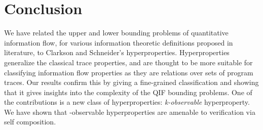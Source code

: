 \documentclass[]{eptcs}
\begin{document}
\section{Conclusion}

We have related the upper and lower bounding problems of quantitative
information flow, for various information theoretic definitions
proposed in literature, to Clarkson and Schneider's hyperproperties.
Hyperproperties generalize the classical trace properties, and are
thought to be more suitable for classifying information flow
properties as they are relations over sets of program traces.  Our
results confirm this by giving a fine-grained classification and
showing that it gives insights into the complexity of the QIF bounding
problems.  One of the contributions is a new class of hyperproperties:
{\em k-observable} hyperproperty.  We have shown that -observable
hyperproperties are amenable to verification via self composition.



\end{document}
